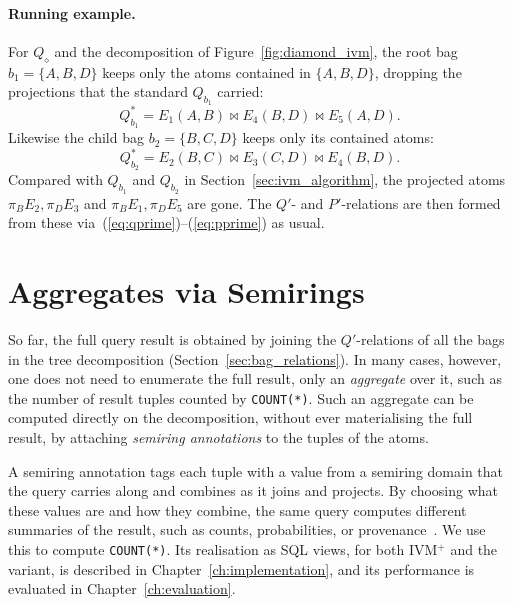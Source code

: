 \paragraph{Running example.}
For $Q_\diamond$ and the decomposition of Figure~\ref{fig:diamond_ivm}, the root bag $b_1 = \{A,B,D\}$ keeps only the atoms contained in $\{A,B,D\}$, dropping the projections that the standard $Q_{b_1}$ carried:
\[
    Q^*_{b_1} = E_1(A,B) \bowtie E_4(B,D) \bowtie E_5(A,D).
\]
Likewise the child bag $b_2 = \{B,C,D\}$ keeps only its contained atoms:
\[
    Q^*_{b_2} = E_2(B,C) \bowtie E_3(C,D) \bowtie E_4(B,D).
\]
Compared with $Q_{b_1}$ and $Q_{b_2}$ in Section~\ref{sec:ivm_algorithm}, the projected atoms $\pi_{B}E_2, \pi_{D}E_3$ and $\pi_{B}E_1, \pi_{D}E_5$ are gone. The $Q'$- and $P'$-relations are then formed from these via~(\ref{eq:qprime})--(\ref{eq:pprime}) as usual.

\section{Aggregates via Semirings}
\label{sec:semiring}

So far, the full query result is obtained by joining the $Q'$-relations of all the bags in the tree decomposition (Section~\ref{sec:bag_relations}).
In many cases, however, one does not need to enumerate the full result, only an \emph{aggregate} over it, such as the number of result tuples counted by \texttt{COUNT(*)}.
Such an aggregate can be computed directly on the decomposition, without ever materialising the full result, by attaching \emph{semiring annotations} to the tuples of the atoms.

A semiring annotation tags each tuple with a value from a semiring domain that the query carries along and combines as it joins and projects.
By choosing what these values are and how they combine, the same query computes different summaries of the result, such as counts, probabilities, or provenance~\cite{green2007}.
We use this to compute \texttt{COUNT(*)}.
Its realisation as SQL views, for both IVM$^+$ and the variant, is described in Chapter~\ref{ch:implementation}, and its performance is evaluated in Chapter~\ref{ch:evaluation}.

